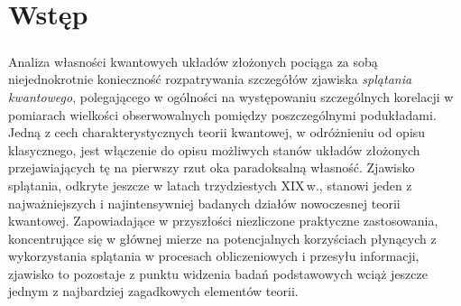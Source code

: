
\chapter{Wstęp}
\label{chp:intro}

\paragraph{}
\label{par:intro:01}
Analiza własności kwantowych układów złożonych pociąga za sobą niejednokrotnie
konieczność rozpatrywania szczegółów zjawiska
 \emph{splątania kwantowego},
polegającego w ogólności na występowaniu szczególnych korelacji w pomiarach 
wielkości obserwowalnych pomiędzy poszczególnymi podukładami. 
Jedną z cech charakterystycznych teorii kwantowej,
w odróżnieniu od opisu klasycznego,
jest włączenie do opisu możliwych stanów układów złożonych
przejawiających tę na pierwszy rzut oka paradoksalną własność.
Zjawisko splątania, odkryte jeszcze w latach trzydziestych XIX\,w.,
stanowi jeden z najważniejszych i najintensywniej badanych działów nowoczesnej
teorii kwantowej.
Zapowiadające w przyszłości niezliczone praktyczne zastosowania,
koncentrujące się w głównej mierze na potencjalnych korzyściach płynących
z wykorzystania splątania w procesach obliczeniowych i przesyłu informacji,
zjawisko to pozostaje z punktu widzenia badań podstawowych wciąż jeszcze jednym
z najbardziej zagadkowych elementów teorii.

